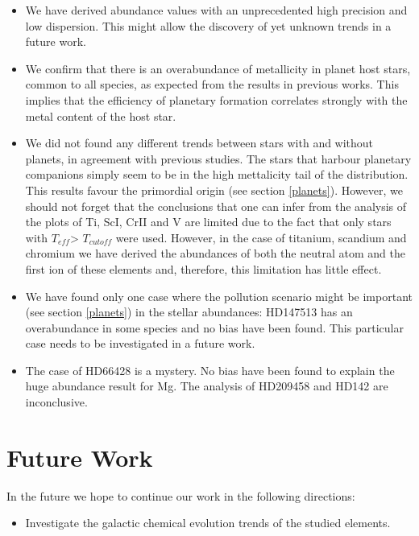 \documentclass[dvips,12pt,a4paper]{report}
\begin{document}
{{\begin{itemize}
\item We have derived abundance values with an unprecedented high precision and low dispersion. This might allow the discovery of yet unknown trends in a future work. 
\item We confirm that there is an overabundance of metallicity in planet host stars, common to all species, as expected from the results in previous works. This implies that the efficiency of planetary formation correlates strongly with the metal content of the host star. 
\item We did not found any different trends between stars with and without planets, in agreement with previous studies. The stars that harbour planetary companions simply seem to be in the high mettalicity tail of the distribution. This results favour the primordial origin (see section \ref{planets}). However, we should not forget that the conclusions that one can infer from the analysis of the plots of Ti, ScI, CrII and V are limited due to the fact that only stars with $T_{eff}$> $T_{cutoff}$ were used. However, in the case of titanium, scandium and chromium we have derived the abundances of both the neutral atom and the first ion of these elements and, therefore, this limitation has little effect.  %
\item We have found only one case where the pollution scenario might be important (see section \ref{planets}) in the stellar abundances: HD147513 has an overabundance in some species and no bias have been found. This particular case needs to be investigated in a future work.
\item The case of HD66428 is a mystery. No bias have been found to explain the huge abundance result for Mg. The analysis of HD209458 and HD142 are inconclusive. 


\end{itemize}

\section {Future Work}

In the future we hope to continue our work in the following directions:

\begin{itemize}
 
\item Investigate the galactic chemical evolution trends of the studied elements.


\end{itemize}}}
\end{document}
